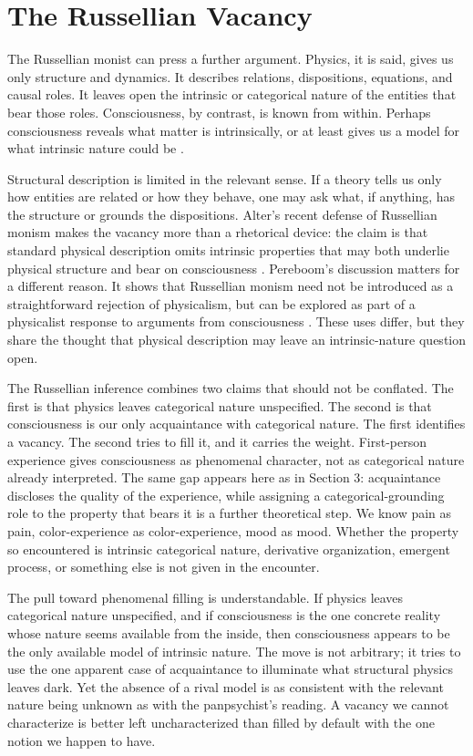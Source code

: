 \section{The Russellian Vacancy}

The Russellian monist can press a further argument. Physics, it is said, gives us only structure and dynamics. It describes relations, dispositions, equations, and causal roles. It leaves open the intrinsic or categorical nature of the entities that bear those roles. Consciousness, by contrast, is known from within. Perhaps consciousness reveals what matter is intrinsically, or at least gives us a model for what intrinsic nature could be \citep{goff2017cfr,alter2023matter,pereboom2011physicalism}.

Structural description is limited in the relevant sense. If a theory tells us only how entities are related or how they behave, one may ask what, if anything, has the structure or grounds the dispositions. Alter's recent defense of Russellian monism makes the vacancy more than a rhetorical device: the claim is that standard physical description omits intrinsic properties that may both underlie physical structure and bear on consciousness \citep{alter2023matter}. Pereboom's discussion matters for a different reason. It shows that Russellian monism need not be introduced as a straightforward rejection of physicalism, but can be explored as part of a physicalist response to arguments from consciousness \citep{pereboom2011physicalism}. These uses differ, but they share the thought that physical description may leave an intrinsic-nature question open.

The Russellian inference combines two claims that should not be conflated. The first is that physics leaves categorical nature unspecified. The second is that consciousness is our only acquaintance with categorical nature. The first identifies a vacancy. The second tries to fill it, and it carries the weight. First-person experience gives consciousness as phenomenal character, not as categorical nature already interpreted. The same gap appears here as in Section 3: acquaintance discloses the quality of the experience, while assigning a categorical-grounding role to the property that bears it is a further theoretical step. We know pain as pain, color-experience as color-experience, mood as mood. Whether the property so encountered is intrinsic categorical nature, derivative organization, emergent process, or something else is not given in the encounter.

The pull toward phenomenal filling is understandable. If physics leaves categorical nature unspecified, and if consciousness is the one concrete reality whose nature seems available from the inside, then consciousness appears to be the only available model of intrinsic nature. The move is not arbitrary; it tries to use the one apparent case of acquaintance to illuminate what structural physics leaves dark. Yet the absence of a rival model is as consistent with the relevant nature being unknown as with the panpsychist's reading. A vacancy we cannot characterize is better left uncharacterized than filled by default with the one notion we happen to have.

